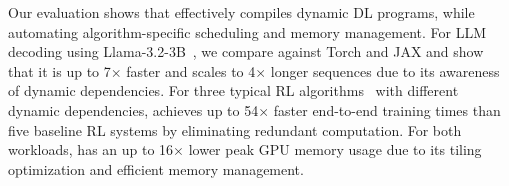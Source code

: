 Our evaluation shows that \sys{} effectively compiles dynamic DL programs, while automating algorithm-specific scheduling and memory management. For LLM decoding using Llama-3.2-3B~\cite{dubey2024llama}, we compare \sys{} against Torch and JAX and show that it is up to 7$\times$ faster and scales to 4$\times$ longer sequences due to its awareness of dynamic dependencies. For three typical RL algorithms~\cite{schulman2017proximal, williams1992simple, sutton1988learning} with different dynamic dependencies, \sys achieves up to 54$\times$ faster end-to-end training times than five baseline RL systems by eliminating redundant computation. For both workloads, \sys{} has an up to 16$\times$ lower peak GPU memory usage due to its tiling optimization and efficient memory management.



